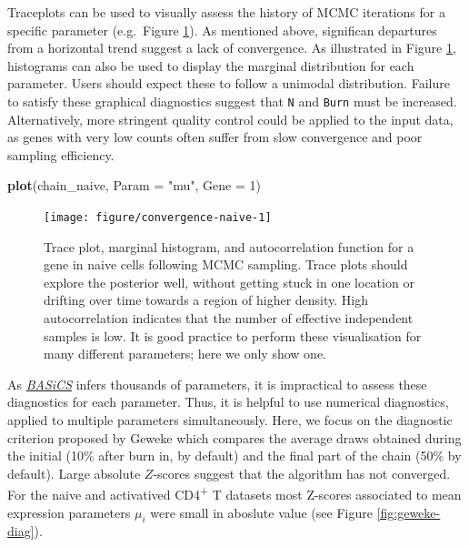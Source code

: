 \documentclass[9pt,a4paper,]{extarticle}
\newenvironment{Shaded}{\begin{snugshade}}{\end{snugshade}}
\newcommand{\DataTypeTok}[1]{\textcolor[rgb]{0.13,0.29,0.53}{#1}}
\newcommand{\DecValTok}[1]{\textcolor[rgb]{0.00,0.00,0.81}{#1}}
\newcommand{\KeywordTok}[1]{\textcolor[rgb]{0.13,0.29,0.53}{\textbf{#1}}}
\newcommand{\NormalTok}[1]{#1}
\newcommand{\StringTok}[1]{\textcolor[rgb]{0.31,0.60,0.02}{#1}}
\begin{document}
Traceplots can be used to visually assess the history of MCMC iterations
for a specific parameter (e.g.~Figure \ref{fig:convergence-naive}).
As mentioned above, significan departures from a horizontal trend suggest a
lack of convergence.
As illustrated in Figure \ref{fig:convergence-naive}, histograms can also be
used to display the marginal distribution for each parameter.
Users should expect these to follow a unimodal distribution.
Failure to satisfy these graphical diagnostics suggest that \texttt{N} and \texttt{Burn} must
be increased.
Alternatively, more stringent quality control could be applied to the input
data, as genes with very low counts often suffer from slow convergence and poor sampling efficiency.

\begin{Shaded}
\begin{Highlighting}[]
\KeywordTok{plot}\NormalTok{(chain_naive, }\DataTypeTok{Param =} \StringTok{"mu"}\NormalTok{, }\DataTypeTok{Gene =} \DecValTok{1}\NormalTok{)}
\end{Highlighting}
\end{Shaded}

\begin{figure}

{\centering \texttt{[image: figure/convergence-naive-1]} 

}

\caption{Trace plot, marginal histogram, and autocorrelation function for a gene in naive cells following MCMC sampling. Trace plots should explore the posterior well, without getting stuck in one location or drifting over time towards a region of higher density. High autocorrelation indicates that the number of effective independent samples is low. It is good practice to perform these visualisation for many different parameters; here we only show one.}\label{fig:convergence-naive}
\end{figure}

As \emph{\href{https://bioconductor.org/packages/3.11/BASiCS}{BASiCS}} infers thousands of parameters, it is
impractical to assess these diagnostics for each parameter.
Thus, it is helpful to use numerical diagnostics, applied to multiple
parameters simultaneously.
Here, we focus on the diagnostic criterion proposed by Geweke \citep{Geweke1995}
which compares the average draws obtained during the initial (10\% after burn
in, by default) and the final part of the chain (50\% by default).
Large absolute \(Z\)-scores suggest that the algorithm has not converged.
For the naive and activatived CD4\textsuperscript{+} T datasets most Z-scores associated to mean
expression parameters \(\mu_i\) were small in aboslute value (see
Figure \ref{fig:geweke-diag}).
\end{document}
